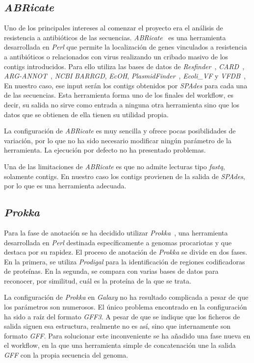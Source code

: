 \subsection{\itshape{ABRicate}}
Uno de los principales intereses al comenzar el proyecto era el análisis de resistencia a antibióticos de las secuencias. \textit{ABRicate}~\cite{seemann_:mag_right:_2019} es una herramienta desarrollada en \textit{Perl} que permite la localización de genes vinculados a resistencia a antibióticos o relacionados con virus realizando un cribado masivo de los contigs introducidos. Para ello utiliza las bases de datos de \textit{Resfinder}~\cite{Resfinder}, \textit{CARD}~\cite{CARD}, \textit{ARG-ANNOT}~\cite{Gupta212}, \textit{NCBI} \textit{BARRGD}, \textit{EcOH}, \textit{PlasmidFinder}~\cite{Carattoli3895}, \textit{Ecoli\_VF} y \textit{VFDB}~\cite{VFDB}, En nuestro caso, ese input serán los contigs obtenidos por \textit{SPAdes} para cada una de las secuencias. Esta herramienta forma uno de los finales del workflow, es decir, su salida no sirve como entrada a ninguna otra herramienta sino que los datos que se obtienen de ella tienen su utilidad propia.

La configuración de \textit{ABRicate} es muy sencilla y ofrece pocas posibilidades de variación, por lo que no ha sido necesario modificar ningún parámetro de la herramienta. La ejecución por defecto no ha presentado problemas.

Una de las limitaciones de \textit{ABRicate} es que no admite lecturas tipo \textit{fastq}, solamente contigs. En nuestro caso los contigs provienen de la salida de \textit{SPAdes}, por lo que es una herramienta adecuada.

\subsection{\itshape{Prokka}}
Para la fase de anotación se ha decidido utilizar \textit{Prokka}~\cite{Seemann2014}, una herramienta desarrollada en \textit{Perl} destinada específicamente a genomas procariotas y que destaca por su rapidez. El proceso de anotación de \textit{Prokka} se divide en dos fases. En la primera, se utiliza \textit{Prodigal} para la identificación de regiones codificadoras de proteínas. En la segunda, se compara con varias bases de datos para reconocer, por similitud, cuál es la proteína de la que se trata.

La configuración de \textit{Prokka} en \textit{Galaxy} no ha resultado complicada a pesar de que los parámetros son numerosos. El único problema encontrado en la configuración ha sido a raíz del formato \textit{GFF3}. A pesar de que se indique que los ficheros de salida siguen esa estructura, realmente no es así, sino que internamente son formato \textit{GFF}. Para solucionar este inconveniente se ha añadido una fase nueva en el workflow, en la que una herramienta simple de concatenación une la salida \textit{GFF} con la propia secuencia del genoma.


